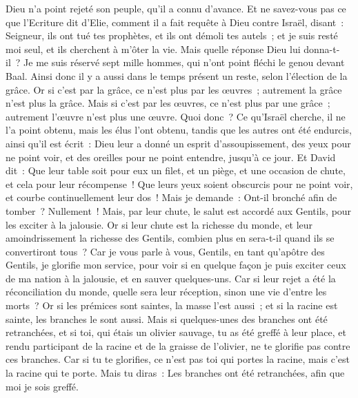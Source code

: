 \begin{multicols}{2}
Dieu n'a point rejeté son peuple, qu'il a connu d'avance. Et ne savez-vous pas ce que l'Ecriture dit d'Elie, comment il a fait requête à Dieu contre Israël, disant~:
Seigneur, ils ont tué tes prophètes, et ils ont démoli tes autels~; et je suis resté moi seul, et ils cherchent à m'ôter la vie.
Mais quelle réponse Dieu lui donna-t-il~? Je me suis réservé sept mille hommes, qui n'ont point fléchi le genou devant Baal.
Ainsi donc il y a aussi dans le temps présent un reste, selon l'élection de la grâce.
Or si c'est par la grâce, ce n'est plus par les œuvres~; autrement la grâce n'est plus la grâce. Mais si c'est par les œuvres, ce n'est plus par une grâce~; autrement l'œuvre n'est plus une œuvre.
Quoi donc~? Ce qu'Israël cherche, il ne l'a point obtenu, mais les élus l'ont obtenu, tandis que les autres ont été endurcis,
ainsi qu'il est écrit~: Dieu leur a donné un esprit d'assoupissement, des yeux pour ne point voir, et des oreilles pour ne point entendre, jusqu'à ce jour. Et David dit~:
Que leur table soit pour eux un filet, et un piège, et une occasion de chute, et cela pour leur récompense~!
Que leurs yeux soient obscurcis pour ne point voir, et courbe continuellement leur dos~!
Mais je demande~: Ont-il bronché afin de tomber~? Nullement~! Mais, par leur chute, le salut est accordé aux Gentils, pour les exciter à la jalousie.
Or si leur chute est la richesse du monde, et leur amoindrissement la richesse des Gentils, combien plus en sera-t-il quand ils se convertiront tous~?
Car je vous parle à vous, Gentils, en tant qu'apôtre des Gentils, je glorifie mon service,
pour voir si en quelque façon je puis exciter ceux de ma nation à la jalousie, et en sauver quelques-uns.
Car si leur rejet a été la réconciliation du monde, quelle sera leur réception, sinon une vie d'entre les morts~?
Or si les prémices sont saintes, la masse l'est aussi~; et si la racine est sainte, les branches le sont aussi.
Mais si quelques-unes des branches ont été retranchées, et si toi, qui étais un olivier sauvage, tu as été greffé à leur place, et rendu participant de la racine et de la graisse de l'olivier,
ne te glorifie pas contre ces branches. Car si tu te glorifies, ce n'est pas toi qui portes la racine, mais c'est la racine qui te porte.
Mais tu diras~: Les branches ont été retranchées, afin que moi je sois greffé.

\end{multicols}
